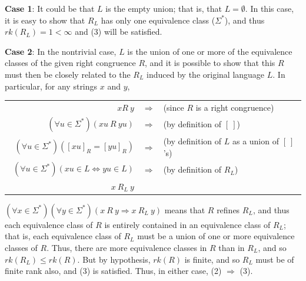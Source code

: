\begin{thm}
\textbf{Case 1}: It could be that $L$ is the empty union; that is, that
$L=\emptyset$. In this case, it is easy to show that $R_L$ has only one
equivalence class ($\Sigma^*$), and thus $rk(R_L) = 1 < \infty$ and (3) will be
satisfied.

\textbf{Case 2}: In the nontrivial case, $L$ is the union of one or more of the
equivalence classes of the given right congruence $R$, and it is possible to
show that this $R$ must then be closely related to the $R_L$ induced by the
original language $L$. In particular, for any strings $x$ and $y$,
\begin{center}\begin{tabular}{rcl}
$x R\ y$ & $\Rightarrow$ & (since $R$ is a right congruence) \\
$(\forall u \in \Sigma^*)(xu\ R\ yu)$ & $\Rightarrow$ & (by definition of
	$[\ ]$) \\
$(\forall u \in \Sigma^*)([xu]_R = [yu]_R)$ & $\Rightarrow$ & (by definition of
	$L$ as a union of $[\ ]$'s) \\\
$(\forall u \in \Sigma^*)(xu \in L \Leftrightarrow yu \in L)$ & $\Rightarrow$ &
	(by definition of $R_L$) \\
$x\ R_L\ y$ &&
\end{tabular}\end{center}
$(\forall x \in \Sigma^*)(\forall y \in \Sigma^*)(x\ R\ y \Rightarrow x\ R_L\ y)$
means that $R$ refines $R_L$, and thus each equivalence class of $R$ is entirely
contained in an equivalence class of $R_L$; that is, each equivalence class of
$R_L$ must be a union of one or more equivalence classes of $R$. Thus, there are
more equivalence classes in $R$ than in $R_L$, and so $rk(R_L) \leq rk(R)$. But by
hypothesis, $rk(R)$ is finite, and so $R_L$ must be of finite rank also, and
(3) is satisfied. Thus, in either case, (2) $\Rightarrow$ (3).


\end{thm}
